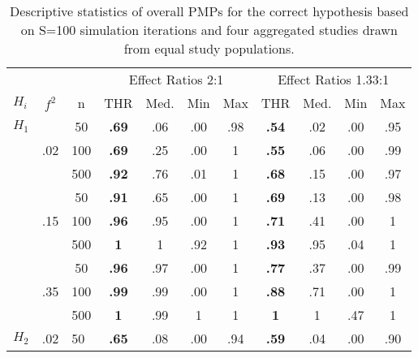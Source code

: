 \documentclass[11pt, a4paper]{article} %
\begin{document}
\newpage

\begin{table}[H]
	\centering
	\caption{Descriptive statistics of overall PMPs for the correct hypothesis based on S=100 simulation iterations and four aggregated studies drawn from equal study populations.}
	\label{my-label}
	\begin{tabular}{lllcccccccc}
		\hline
		&                           &                         & \multicolumn{4}{c}{Effect Ratios 2:1} & \multicolumn{4}{c}{Effect Ratios 1.33:1} \\
		$H_i$ & \multicolumn{1}{c}{$f^2$} & \multicolumn{1}{c}{n}   & THR            & Med.   & Min   & Max  & THR             & Med.    & Min   & Max   \\ \hline
		$H_1$ & \multirow{3}{*}{.02}      & \multicolumn{1}{c}{50}  & \textbf{.69}   & .06   & .00   & .98  & \textbf{.54}    & .02    & .00   & .95   \\
		&                           & \multicolumn{1}{c}{100} & \textbf{.69}   & .25   & .00   & 1    & \textbf{.55}    & .06    & .00   & .99   \\
		&                           & \multicolumn{1}{c}{500} & \textbf{.92}   & .76   & .01   & 1    & \textbf{.68}    & .15    & .00   & .97   \\
		& \multirow{3}{*}{.15}      & \multicolumn{1}{c}{50}  & \textbf{.91}   & .65   & .00   & 1    & \textbf{.69}    & .13    & .00   & .98   \\
		&                           & \multicolumn{1}{c}{100} & \textbf{.96}   & .95   & .00   & 1    & \textbf{.71}    & .41    & .00   & 1     \\
		&                           & \multicolumn{1}{c}{500} & \textbf{1}     & 1     & .92   & 1    & \textbf{.93}    & .95    & .04   & 1     \\
		& \multirow{3}{*}{.35}      & \multicolumn{1}{c}{50}  & \textbf{.96}   & .97   & .00   & 1    & \textbf{.77}    & .37    & .00   & .99   \\
		&                           & \multicolumn{1}{c}{100} & \textbf{.99}   & .99   & .00   & 1    & \textbf{.88}    & .71    & .00   & 1     \\
		&                           & \multicolumn{1}{c}{500} & \textbf{1}     & .99   & 1     & 1    & \textbf{1}      & 1      & .47   & 1     \\ \hline
		$H_2$ & \multirow{3}{*}{.02}      & 50                      & \textbf{.65}   & .08   & .00   & .94  & \textbf{.59}    & .04    & .00   & .90   \\

\end{tabular}
\end{table}
\end{document}
